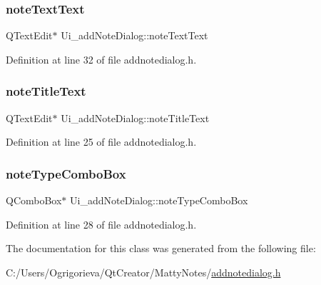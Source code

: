 \subsubsection{\texorpdfstring{note\+Text\+Text}{noteTextText}}
{\footnotesize\ttfamily Q\+Text\+Edit$\ast$ Ui\+\_\+add\+Note\+Dialog\+::note\+Text\+Text}



Definition at line 32 of file addnotedialog.\+h.

\hypertarget{classUi__addNoteDialog_ab6a4a2b756400a734bf7f4d786aa8d20}{}\label{classUi__addNoteDialog_ab6a4a2b756400a734bf7f4d786aa8d20} 
\subsubsection{\texorpdfstring{note\+Title\+Text}{noteTitleText}}
{\footnotesize\ttfamily Q\+Text\+Edit$\ast$ Ui\+\_\+add\+Note\+Dialog\+::note\+Title\+Text}



Definition at line 25 of file addnotedialog.\+h.

\hypertarget{classUi__addNoteDialog_acf0ac47d3c4f567ca69a17769d35409d}{}\label{classUi__addNoteDialog_acf0ac47d3c4f567ca69a17769d35409d} 
\subsubsection{\texorpdfstring{note\+Type\+Combo\+Box}{noteTypeComboBox}}
{\footnotesize\ttfamily Q\+Combo\+Box$\ast$ Ui\+\_\+add\+Note\+Dialog\+::note\+Type\+Combo\+Box}



Definition at line 28 of file addnotedialog.\+h.



The documentation for this class was generated from the following file\+:\begin{DoxyCompactItemize}
\item 
C\+:/\+Users/\+Ogrigorieva/\+Qt\+Creator/\+Matty\+Notes/\hyperlink{addnotedialog_8h}{addnotedialog.\+h}\end{DoxyCompactItemize}
